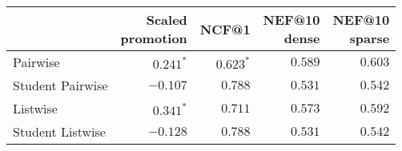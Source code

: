 \begin{tabular}{lrrrr}
\toprule
             & \makecell{Scaled \\ promotion} & NCF@1 & \makecell{NEF@10 \\ dense} & \makecell{NEF@10 \\ sparse} \\
\midrule
       Pairwise    & $0.241^{*}$  &  $0.623^{*}$  &  $0.589$  &  $0.603$  \\
       Student Pairwise & $-0.107$  &$  0.788$  &  $0.531$  &  $0.542$  \\
       Listwise         & $0.341^{*}$  &  $0.711$  &  $0.573$  &  $0.592$  \\
       Student Listwise    & $-0.128$  &  $0.788$  &  $0.531$  &  $0.542$  \\
\bottomrule
\end{tabular}



